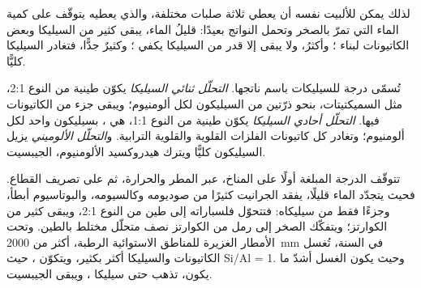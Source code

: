 لذلك يمكن للألبيت نفسه أن يعطي ثلاثة صلبات مختلفة، والذي يعطيه يتوقّف على كمية الماء التي تمرّ بالصخر وتحمل النواتج بعيدًا: قليلُ الماء، يبقى كثير من السيليكا وبعض الكاتيونات لبناء ؛ وأكثرُ، ولا يبقى إلا قدر من السيليكا يكفي ؛ وكثيرٌ جدًّا، فتغادر السيليكا كليًّا.

\begin{definition}\label{def:b1:weathering-clays:hydrolysis-degree}
تُسمّى درجة  للسيليكات باسم ناتجها. \emph{التحلّل ثنائي السيليكا} يكوّن  طينية من النوع 2:1، مثل السميكتيتات، بنحو ذرّتين من السيليكون لكل ألومنيوم؛ ويبقى جزء من الكاتيونات فيها. \emph{التحلّل أحادي السيليكا} يكوّن  طينية من النوع 1:1، هي ، بسيليكون واحد لكل ألومنيوم؛ وتغادر كل كاتيونات الفلزات القلوية والقلوية الترابية. و\emph{التحلّل الألوميني} يزيل السيليكون كليًّا ويترك هيدروكسيد الألومنيوم، الجيبسيت.
\end{definition}

تتوقّف الدرجة المبلغة أولًا على المناخ، عبر المطر والحرارة، ثم على تصريف القطاع. فحيث يتجدّد الماء قليلًا، يفقد الجرانيت كثيرًا من صوديومه وكالسيومه، والبوتاسيوم أبطأ، وجزءًا فقط من سيليكاه: فتتحوّل فلسباراته إلى طين من النوع 2:1، ويبقى كثير من الكوارتز؛ ويتفكّك الصخر إلى رمل من الكوارتز   نصف متحلّل مختلط بالطين. وتحت الأمطار الغزيرة للمناطق الاستوائية الرطبة، أكثر من \qty{2000}{mm} في السنة، تُغسل الكاتيونات والسيليكا أكثر بكثير، ويتكوّن ، حيث Si/Al = 1. وحيث يكون الغسل أشدّ ما يكون، تذهب حتى سيليكا ، ويبقى الجيبسيت.

